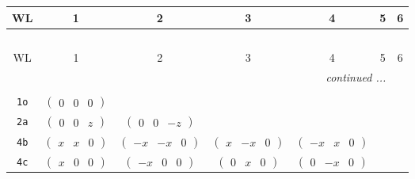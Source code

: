 \documentclass[fleqn,9pt,landscape]{jsarticle}
\begin{document}
\begin{center}
\renewcommand{\arraystretch}{1.2}
\begin{longtable}{ccccccc}
 \hline \hline
WL & 1 & 2 & 3 & 4 & 5 & 6 \\ \hline \endfirsthead

\multicolumn{6}{l}{\tablename\ \thetable{}} \\
 \hline \hline
WL & 1 & 2 & 3 & 4 & 5 & 6 \\ \hline \endhead

 \hline \hline
\multicolumn{6}{r}{\footnotesize\it continued ...} \\ \endfoot

 \hline \hline
\multicolumn{6}{r}{} \\ \endlastfoot

{\tt 1o} & $ \begin{pmatrix} 0 & 0 & 0 \end{pmatrix} $ & $  $ & $  $ & $  $ & $  $ & $  $ \\ \hline
{\tt 2a} & $ \begin{pmatrix} 0 & 0 & z \end{pmatrix} $ & $ \begin{pmatrix} 0 & 0 & - z \end{pmatrix} $ & $  $ & $  $ & $  $ & $  $ \\ \hline
{\tt 4b} & $ \begin{pmatrix} x & x & 0 \end{pmatrix} $ & $ \begin{pmatrix} - x & - x & 0 \end{pmatrix} $ & $ \begin{pmatrix} x & - x & 0 \end{pmatrix} $ & $ \begin{pmatrix} - x & x & 0 \end{pmatrix} $ & $  $ & $  $ \\ \hline
{\tt 4c} & $ \begin{pmatrix} x & 0 & 0 \end{pmatrix} $ & $ \begin{pmatrix} - x & 0 & 0 \end{pmatrix} $ & $ \begin{pmatrix} 0 & x & 0 \end{pmatrix} $ & $ \begin{pmatrix} 0 & - x & 0 \end{pmatrix} $ & $  $ & $  $ \\ \hline

\end{longtable}
\end{center}
\end{document}
